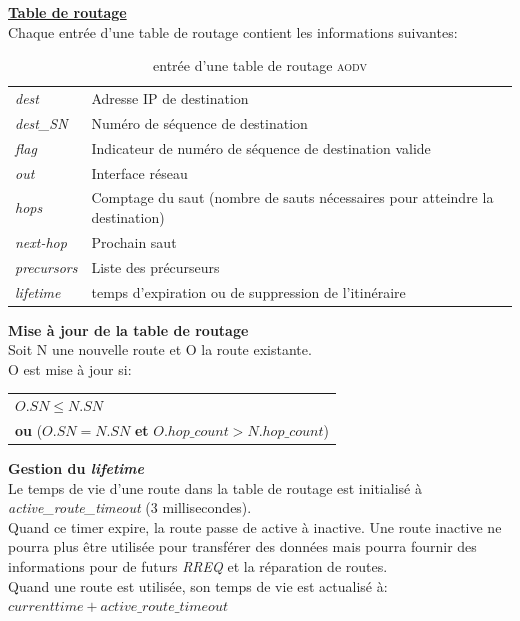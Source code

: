 \documentclass[a4paper, 12pt]{report}
\newcommand{\aodv}{\textsc{aodv}}
\begin{document}
        \underline{\textbf{Table de routage}}\\
        
        Chaque entrée d'une table de routage contient les informations suivantes:
        
        \begin{table}[H]
            \centering
            \begin{tabular}{|l|l|}
                \hline
                \textit{dest}       & Adresse IP de destination\\
                \textit{dest\_SN}   & Numéro de séquence de destination\\
                \textit{flag}       & Indicateur de numéro de séquence de destination valide\\
                \textit{out}        & Interface réseau\\
                \textit{hops}       & Comptage du saut (nombre de sauts nécessaires pour atteindre la destination)\\
                \textit{next-hop}   & Prochain saut\\
                \textit{precursors} & Liste des précurseurs\\
                \textit{lifetime}   & temps d'expiration ou de suppression de l'itinéraire\\
                \hline
            \end{tabular}
            \caption{entrée d'une table de routage \aodv \cite{aodv_w}}
            \label{routingTable_aodv}
        \end{table}

        \textbf{Mise à jour de la table de routage}\\
            Soit N une nouvelle route et O la route existante.\\
            O est mise à jour si:\\
            \begin{center}
                \begin{tabular}{|l|}
                    \hline
                    $O.SN \leq N.SN$ \\
                    \textbf{ou} ($O.SN = N.SN$ \textbf{et} $O.hop\_count > N.hop\_count$)\\
                    \hline
                \end{tabular}
            \end{center}
        
        \textbf{Gestion du \textit{lifetime}}\\
            Le temps de vie d'une route dans la table de routage est initialisé à \textit{active\_route\_timeout} (3 millisecondes).\\
            Quand ce timer expire, la route passe de active à inactive. Une route inactive ne pourra plus être utilisée pour transférer des données
            mais pourra fournir des informations pour de futurs \textit{RREQ} et la réparation de routes.\\
            Quand une route est utilisée, son temps de vie  est actualisé à: $current time + active\_route\_timeout$
\end{document}
